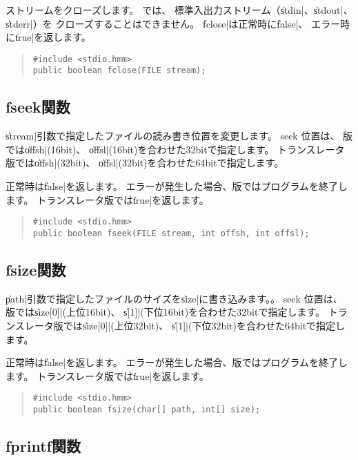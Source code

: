 ストリームをクローズします。
\tacos では、
標準入出力ストリーム（\|stdin|、\|stdout|、\|stderr|）を
クローズすることはできません。
\|fclose|は正常時に\|false|、
エラー時に\|true|を返します。

\begin{quote}
\begin{verbatim}
#include <stdio.hmm>
public boolean fclose(FILE stream);
\end{verbatim}
\end{quote}

\subsection{fseek関数}

\|stream|引数で指定したファイルの読み書き位置を変更します。
seek 位置は、
\tac 版では\|offsh|(16bit)、
\|offsl|(16bit)を合わせた32bitで指定します。
トランスレータ版では\|offsh|(32bit)、
\|offsl|(32bit)を合わせた64bitで指定します。

正常時は\|false|を返します。
エラーが発生した場合、\tac 版ではプログラムを終了します。
トランスレータ版では\|true|を返します。

\begin{quote}
\begin{verbatim}
#include <stdio.hmm>
public boolean fseek(FILE stream, int offsh, int offsl);
\end{verbatim}
\end{quote}

\subsection{fsize関数}

\|path|引数で指定したファイルのサイズを\|size|に書き込みます。。
seek 位置は、
\tac 版では\|size[0]|(上位16bit)、
\|s[1]|(下位16bit)を合わせた32bitで指定します。
トランスレータ版では\|size[0]|(上位32bit)、
\|s[1]|(下位32bit)を合わせた64bitで指定します。

正常時は\|false|を返します。
エラーが発生した場合、\tac 版ではプログラムを終了します。
トランスレータ版では\|true|を返します。

\begin{quote}
\begin{verbatim}
#include <stdio.hmm>
public boolean fsize(char[] path, int[] size);
\end{verbatim}
\end{quote}

\subsection{fprintf関数}

